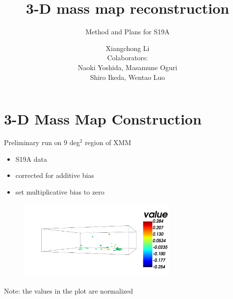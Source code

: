 \documentclass[9pt]{beamer}
\title{3-D mass map reconstruction}
\subtitle{Method and Plans for S19A}
\author{Xiangchong Li\\
Colaborators:\\
Naoki Yoshida, Masamune Oguri\\
Shiro Ikeda, Wentao Luo
}
\begin{document}
\titlepage


\section{3-D Mass Map Construction}



\begin{frame}{Preliminary run on $9$ deg$^2$ region of XMM}
\begin{itemize}
    \item S19A data
    \item corrected for additive bias
    \item set multiplicative bias to zero
\end{itemize}
\begin{figure}
\centering
\includegraphics[width=0.7\textwidth]{3D-1cut.png}
\end{figure}
Note: the values in the plot are normalized
\end{frame}
\end{document}
